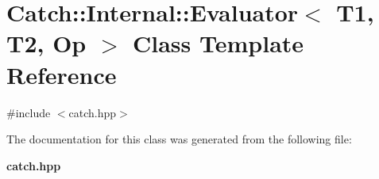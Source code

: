 \section{Catch\+:\+:Internal\+:\+:Evaluator$<$ T1, T2, Op $>$ Class Template Reference}
\label{class_catch_1_1_internal_1_1_evaluator}


{\ttfamily \#include $<$catch.\+hpp$>$}



The documentation for this class was generated from the following file\+:\begin{DoxyCompactItemize}
\item 
\textbf{ catch.\+hpp}\end{DoxyCompactItemize}
